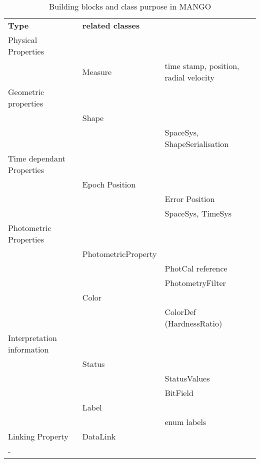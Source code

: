  \begin{table}[ht]
  \begin{center}
  \caption{Building blocks and class purpose in MANGO }
  \label{tab:modelelement}
    \begin{tabular}{p{}p{} p{}}
    \sptablerule
     \textbf{Type}  & \textbf{related classes}   &                     \\\sptablerule
       Physical Properties         &         &                    \\
      & Measure &time stamp, position, radial velocity        \\\sptablerule
      Geometric properties          &  & \\
            &Shape  &      \\
          & & SpaceSys, ShapeSerialisation                          \\\sptablerule
      Time dependant Properties    &    &                   \\
        & Epoch Position     &                  \\
       & & Error Position              \\
       & &SpaceSys, TimeSys               \\\sptablerule
     Photometric Properties   &  &   \\
         &  PhotometricProperty   &      \\           
       & & PhotCal reference         \\
         & & PhotometryFilter  \\
          & Color & \\   
             &   & ColorDef (HardnessRatio)  \\\sptablerule
       Interpretation information  &       &  \\
         &Status \\
           & &StatusValues \\
           & &BitField \\  
         & Label & \\
         &  & enum labels \\\sptablerule
         Linking Property 
         &  DataLink &  \\\sptablerule-    \end{tabular}
 \end{center}
\end{table}

